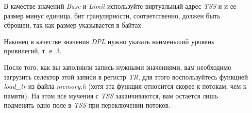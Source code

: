 В качестве значений \emph{Base} и \emph{Limit} используйте виртуальный адрес
\emph{TSS} и и ее размер минус единица, бит гранулярности, соответственно, должен
быть сброшен, так как размер указывается в байтах.

Наконец в качестве значения \emph{DPL} нужно указать наименьший уровень привилегий,
т. е. 3.

После того, как вы заполнили запись нужными значениями, вам необходимо загрузить
селектор этой записи в регистр \emph{TR}, для этого воспользуйтесь функцией
\emph{load\_tr} из файла \emph{memory.h} (хотя эта функция относится скорее к
потокам, чем к памяти). На этом все мучения с \emph{TSS} заканчиваются, вам остается
лишь подменять одно поле в \emph{TSS} при переключении потоков.
